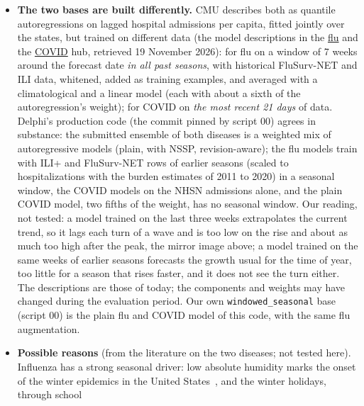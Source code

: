 \documentclass[11pt,a4paper]{article}
\theoremstyle{definition}
\theoremstyle{remark}
\begin{document}
\begin{itemize}[leftmargin=*,itemsep=3pt]
the peak (up to $6\%$), and after it all lose except \texttt{phase\_oracle}
($+0.2\%$, calibration error $0.138$ against $0.184$; hatched in the plots):
each phase uses the correction learned in the phase before, of the other
sign. The bias tree () shows the
sign of the miss directly.
\item \textbf{The two bases are built differently.} CMU describes both as
quantile autoregressions on lagged hospital admissions per capita, fitted
jointly over the states, but trained on different data (the model
descriptions in the
\href{https://github.com/cdcepi/FluSight-forecast-hub/blob/main/model-metadata/CMU-TimeSeries.yml}{flu}
and the
\href{https://github.com/CDCgov/covid19-forecast-hub/blob/main/model-metadata/CMU-TimeSeries.yml}{COVID}
hub, retrieved 19 November 2026): for flu on a window of 7 weeks around
the forecast date \emph{in all past seasons}, with historical FluSurv-NET
and ILI data, whitened, added as training examples, and averaged with a
climatological and a linear model (each with about a sixth of the
autoregression's weight); for COVID on \emph{the most recent 21 days} of
data. Delphi's production code (the commit pinned by script 00) agrees in
substance: the submitted ensemble of both diseases is a weighted mix of
autoregressive models (plain, with NSSP, revision-aware); the flu models
train with ILI+ and FluSurv-NET rows of earlier seasons (scaled to
hospitalizations with the burden estimates of 2011 to 2020) in a seasonal
window, the COVID models on the NHSN admissions alone, and the plain COVID
model, two fifths of the weight, has no seasonal window. Our reading, not
tested: a model trained on the last three weeks extrapolates the current
trend, so it lags each turn of a wave and is too low on the rise and about
as much too high after the peak, the mirror image above; a model trained on
the same weeks of earlier seasons forecasts the growth usual for the time of
year, too little for a season that rises faster, and it does not see the
turn either. The descriptions are those of today; the components and
weights may have changed during the evaluation period. Our own
\texttt{windowed\_seasonal} base (script 00) is the plain flu and COVID
model of this code, with the same flu augmentation.
\item \textbf{Possible reasons} (from the literature on the two diseases;
not tested here). Influenza has a strong seasonal driver: low absolute
humidity marks the onset of the winter epidemics in the United
States~\cite{shaman2010}, and the winter holidays, through school

\end{itemize}
\end{document}

